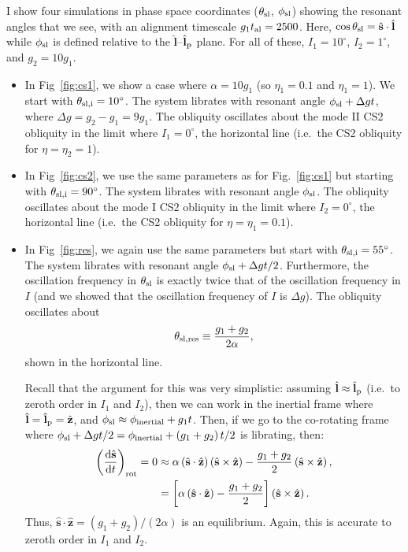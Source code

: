 \documentclass[11pt,
        usenames, %
        dvipsnames %
    ]{article}
\newcommand*{\rd}[2]{\frac{\mathrm{d}#1}{\mathrm{d}#2}}
\newcommand*{\bm}[1]{\boldsymbol{\mathbf{#1}}}
\newcommand*{\uv}[1]{\hat{\bm{#1}}}
\newcommand*{\p}[1]{\left(#1\right)}
\newcommand*{\s}[1]{\left[#1\right]}
\begin{document}
I show four simulations in phase space coordinates ($\theta_{\rm sl}$,
$\phi_{\rm sl}$) showing the resonant angles that we see, with an alignment
timescale $g_1t_{\rm al} = 2500$. Here, $\cos \theta_{\rm sl} = \uv{s} \cdot
\uv{l}$ while $\phi_{\rm sl}$ is defined relative to the $\uv{l}$--$\uv{l}_{\rm
p}$ plane. For all of these, $I_1 = 10^\circ$, $I_2 = 1^\circ$, and $g_2 =
10g_1$.
\begin{itemize}
    \item In Fig~\ref{fig:cs1}, we show a case where $\alpha = 10g_1$ (so
        $\eta_1 = 0.1$ and $\eta_1 = 1$). We start with $\theta_{\rm sl, i} =
        10^\circ$. The system librates with resonant angle $\phi_{\rm sl} +
        \Delta g t$, where $\Delta g = g_2 - g_1 = 9g_1$. The obliquity
        oscillates about the mode II CS2 obliquity in the limit where $I_1 =
        0^\circ$, the horizontal line (i.e.\ the CS2 obliquity for $\eta =
        \eta_2 = 1$).

    \item In Fig~\ref{fig:cs2}, we use the same parameters as for
        Fig.~\ref{fig:cs1} but starting with $\theta_{\rm sl, i} = 90^\circ$.
        The system librates with resonant angle $\phi_{\rm sl}$. The obliquity
        oscillates about the mode I CS2 obliquity in the limit where $I_2 =
        0^\circ$, the horizontal line (i.e.\ the CS2 obliquity for $\eta =
        \eta_1 = 0.1$).

    \item In Fig~\ref{fig:res}, we again use the same parameters but start with
        $\theta_{\rm sl, i} = 55^\circ$. The system librates with resonant angle
        $\phi_{\rm sl} + \Delta g t / 2$. Furthermore, the oscillation frequency
        in $\theta_{\rm sl}$ is exactly twice that of the oscillation frequency
        in $I$ (and we showed that the oscillation frequency of $I$ is $\Delta
        g$). The obliquity oscillates about
        \begin{equation}
            \theta_{\rm sl, res} \equiv \frac{g_1 + g_2}{2\alpha}\label{eq:qslres},
        \end{equation}
        shown in the horizontal line.

        Recall that the argument for this was very simplistic: assuming $\uv{l}
        \approx \uv{l}_{\rm p}$ (i.e.\ to zeroth order in $I_1$ and $I_2$), then
        we can work in the inertial frame where $\uv{l} = \uv{l}_{\rm p} =
        \uv{z}$, and $\phi_{\rm sl} \approx \phi_{\rm inertial} + g_1t$. Then,
        if we go to the co-rotating frame where $\phi_{\rm sl} + \Delta g t / 2
        = \phi_{\rm inertial} + \p{g_1 + g_2}t / 2$ is librating, then:
        \begin{align}
            \p{\rd{\uv{s}}{t}}_{\rm rot}
                = 0 &\approx \alpha\p{\uv{s} \cdot \uv{z}}\p{\uv{s} \times \uv{z}}
                    - \frac{g_1 + g_2}{2}\p{\uv{s} \times \uv{z}},\\
                &= \s{\alpha\p{\uv{s} \cdot \uv{z}}
                    - \frac{g_1 + g_2}{2}}\p{\uv{s} \times \uv{z}}.
        \end{align}
        Thus, $\uv{s} \cdot \uv{z} = (g_1 + g_2) / (2\alpha)$ is an equilibrium.
        Again, this is accurate to zeroth order in $I_1$ and $I_2$.


\end{itemize}
\end{document}
